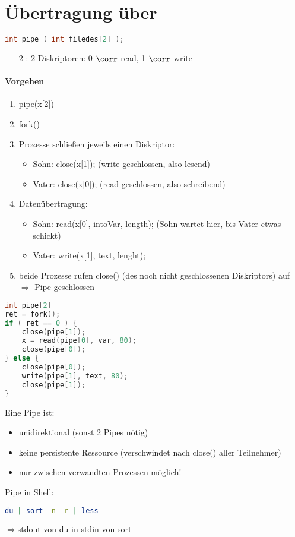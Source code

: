 \section[Übertragung über Pipe]{Übertragung über }
\begin{lstlisting}[language=C]
int pipe ( int filedes[2] );
\end{lstlisting}
\begin{itemize}
\item [2]: 2 Diskriptoren: 0 $\corr$ read, 1 $\corr$ write
\end{itemize}
\paragraph{Vorgehen}
\begin{enumerate}
\item pipe(x[2])
\item fork()
\item Prozesse schließen jeweils einen Diskriptor:
\begin{itemize}
\item Sohn: close(x[1]); (write geschlossen, also lesend)
\item Vater: close(x[0]); (read geschlossen, also schreibend)
\end{itemize}
\item Datenübertragung:
\begin{itemize}
\item Sohn: read(x[0], intoVar, length); (Sohn wartet hier, bis Vater etwas schickt)
\item Vater: write(x[1], text, lenght);
\end{itemize}
\item beide Prozesse rufen close() (des noch nicht geschlossenen Diskriptors) auf $\Rightarrow$ Pipe geschlossen
\end{enumerate}
\begin{lstlisting}[language=C]
int pipe[2]
ret = fork();
if ( ret == 0 ) {
	close(pipe[1]);
	x = read(pipe[0], var, 80);
	close(pipe[0]);
} else {
	close(pipe[0]);
	write(pipe[1], text, 80);
	close(pipe[1]);
}
\end{lstlisting}
Eine Pipe ist:
\begin{itemize}
\item unidirektional (sonst 2 Pipes nötig)
\item keine persistente Ressource (verschwindet nach close() aller Teilnehmer)
\item nur zwischen verwandten Prozessen möglich!
\end{itemize}
Pipe in Shell:
\begin{lstlisting}[language=bash]
du | sort -n -r | less
\end{lstlisting}
$\Rightarrow$stdout von du in stdin von sort


